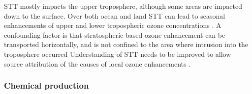     STT mostly impacts the upper troposphere, although some areas are impacted 
    down to the surface.
    Over both ocean and land STT can lead to seasonal enhancements of upper and 
    lower tropospheric ozone concentrations 
    \parencite{Lin2015, Liu2017, Kuang2017}.
    A confounding factor is that stratospheric based ozone enhancement can be 
    transported horizontally, and is not confined to the area where intrusion 
    into the troposphere occurred
    Understanding of STT needs to be improved to allow source attribution of 
    the causes of local ozone enhancements \parencite{Lin2015}.
    
    
  \subsubsection{Chemical production}
    
